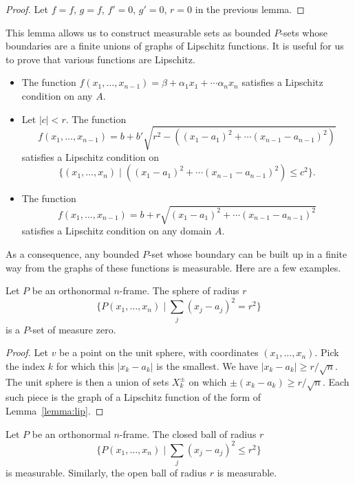 \begin{proof}
Let $f=f$, $g=f$, $f'=0$, $g'=0$, $r=0$ in the previous lemma.
\end{proof}

This lemma allows us to construct measurable sets as bounded
$P$-sets whose boundaries are a finite unions of graphs of Lipschitz
functions.  It is useful for us to prove that various functions are
Lipschitz.

\begin{lemma}\label{lemma:lip}  \begin{itemize}
    \item The function $f(x_1,\ldots,x_{n-1}) = \beta + \alpha_1 x_1 +
\cdots \alpha_n x_n$ satisfies a Lipschitz condition on any $A$.
    \item Let $|c| < r$.  The function
    $$
    f(x_1,\ldots,x_{n-1}) = b +  b'\sqrt{r^2
    - ((x_1-a_1)^2+ \cdots (x_{n-1}-a_{n-1})^2)}
    $$
    satisfies a Lipschitz condition on
    $$
    \{(x_1,\ldots,x_n)\mid ((x_1-a_1)^2 +\cdots (x_{n-1}-a_{n-1})^2) \le c^2\}.
    $$
    \item The function
    $$
    f(x_1,\ldots,x_{n-1}) = b + r \sqrt{(x_1-a_1)^2 + \cdots (x_{n-1}-a_{n-1})^2}
    $$
    satisfies a Lipschitz condition on any domain $A$.
    \end{itemize}
\end{lemma}

As a consequence, any bounded $P$-set whose boundary can be built up
in a finite way from the graphs of these functions is measurable.
Here are a few examples.

\begin{lemma} Let $P$ be an orthonormal $n$-frame.  The sphere of
radius $r$
    $$
    \{P(x_1,\ldots,x_n) \mid \sum_j (x_j-a_j)^2 = r^2\}
    $$
is a $P$-set of measure zero.
\end{lemma}

\begin{proof}
Let $v$ be a point on the unit sphere, with coordinates
$(x_1,\ldots,x_n)$.    Pick the index $k$ for which this $|x_k-a_k|$
is the smallest.  We have $|x_k - a_k|\ge r/\sqrt{n}$.
    The unit sphere is then a union of sets $X^{\pm}_k$ on which
$\pm(x_k - a_k) \ge r/\sqrt{n}$.  Each such piece is the graph of a
Lipschitz function of the form of Lemma~\ref{lemma:lip}.
\end{proof}

\begin{lemma} Let $P$ be an orthonormal $n$-frame.  The closed ball
of radius $r$
    $$
    \{P(x_1,\ldots,x_n) \mid \sum_j (x_j-a_j)^2 \le r^2\}
    $$
is measurable.  Similarly, the open ball of radius $r$ is
measurable.
\end{lemma}

